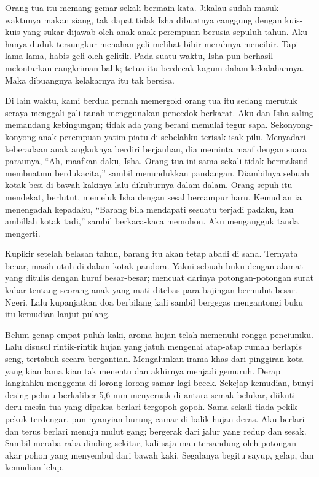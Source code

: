 \documentclass[smalldemyvopaper,11pt,twoside,onecolumn,openright,extrafontsizes]{memoir}
\begin{document}
Orang tua itu memang gemar sekali bermain kata. Jikalau sudah masuk waktunya makan siang, tak dapat tidak Isha dibuatnya canggung dengan kuis-kuis yang sukar dijawab oleh anak-anak perempuan berusia sepuluh tahun. Aku hanya duduk tersungkur menahan geli melihat bibir merahnya mencibir. Tapi lama-lama, habis geli oleh gelitik. Pada suatu waktu, Isha pun berhasil melontarkan cangkriman balik; tetua itu berdecak kagum dalam kekalahannya. Maka dibuangnya kelakarnya itu tak bersisa.


Di lain waktu, kami berdua pernah memergoki orang tua itu sedang merutuk seraya menggali-gali tanah menggunakan pencedok berkarat. Aku dan Isha saling memandang kebingungan; tidak ada yang berani memulai tegur sapa. Sekonyong-konyong anak perempuan yatim piatu di sebelahku terisak-isak pilu. Menyadari keberadaan anak angkuknya berdiri berjauhan, dia meminta maaf dengan suara paraunya, ``Ah, maafkan daku, Isha. Orang tua ini sama sekali tidak bermaksud membuatmu berdukacita,'' sambil menundukkan pandangan. Diambilnya sebuah kotak besi di bawah kakinya lalu dikuburnya dalam-dalam. Orang sepuh itu mendekat, berlutut, memeluk Isha dengan sesal bercampur haru. Kemudian ia menengadah kepadaku, ``Barang bila mendapati sesuatu terjadi padaku, kau ambillah kotak tadi,'' sambil berkaca-kaca memohon. Aku mengangguk tanda mengerti.

Kupikir setelah belasan tahun, barang itu akan tetap abadi di sana. Ternyata benar, masih utuh di dalam kotak pandora. Yakni sebuah buku dengan alamat yang ditulis dengan huruf besar-besar; mencuat darinya potongan-potongan surat kabar tentang seorang anak yang mati ditebas para bajingan bermulut besar. Ngeri. Lalu kupanjatkan doa berbilang kali sambil bergegas mengantongi buku itu kemudian lanjut pulang.


Belum genap empat puluh kaki, aroma hujan telah memenuhi rongga penciumku. Lalu disusul rintik-rintik hujan yang jatuh mengenai atap-atap rumah berlapis seng, tertabuh secara bergantian. Mengalunkan irama khas dari pinggiran kota yang kian lama kian tak menentu dan akhirnya menjadi gemuruh. Derap langkahku menggema di lorong-lorong samar lagi becek. Sekejap kemudian, bunyi desing peluru berkaliber 5,6 mm menyeruak di antara semak belukar, diikuti deru mesin tua yang dipaksa berlari tergopoh-gopoh. Sama sekali tiada pekik-pekuk terdengar, pun nyanyian burung camar di balik hujan deras. Aku berlari dan terus berlari menuju mulut gang; bergerak dari jalur yang redup dan sesak. Sambil meraba-raba dinding sekitar, kali saja mau tersandung oleh potongan akar pohon yang menyembul dari bawah kaki. Segalanya begitu sayup, gelap, dan kemudian lelap.
\end{document}
